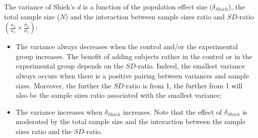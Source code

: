 \documentclass[
  english,
  man,mask]{apa6}
\begin{document}
The variance of Shieh's \(d\) is a function of the population effect size (\(\delta_{Shieh}\)), the total sample size (\(N\)) and the interaction between sample sizes ratio and \(SD\)-ratio \(\left(\frac{n_2}{n_1}\times\frac{\sigma_2}{\sigma_1} \right)\):

\begin{itemize}
\item
  The variance always decreases when the control and/or the experimental group increases. The benefit of adding subjects rather in the control or in the experimental group depends on the \(SD\)-ratio. Indeed, the smallest variance always occurs when there is a positive pairing between variances and sample sizes. Moreover, the further the \(SD\)-ratio is from 1, the further from 1 will also be the sample sizes ratio associated with the smallest variance;
\item
  The variance increases when \(\delta_{Shieh}\) increases. Note that the effect of \(\delta_{Shieh}\) is moderated by the total sample size and the interaction between the sample sizes ratio and the \(SD\)-ratio.
\end{itemize}
\end{document}
